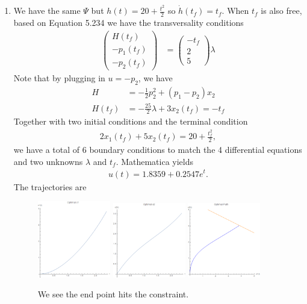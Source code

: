 \documentclass[12pt]{article}
\begin{document}
\begin{problem}[1]
\begin{enumerate}[label=(\alph*)]
\item We have the same $\Psi $ but $ h(t) = 20 +\frac{t^2}{ 2}$ so $ \dot{h}(t_f) = t_f$. When $ t_f$ is also free, based on Equation 5.234 we have the transversality conditions
\begin{align*}
	\begin{pmatrix} H(t_f)\\ -p_1(t_f)\\-p_2(t_f) \end{pmatrix} &= \begin{pmatrix} -t_f\\ 2\\5 \end{pmatrix} \lambda 
\end{align*}
Note that by plugging in $ u=-p_2$, we have
\begin{align*}
	H &= -\frac{1}{2} p_2^2+(p_1-p_2)x_2\\
	H(t_f)&= -\frac{25}{2} \lambda + 3x_2(t_f) = -t_f 
\end{align*}
Together with two initial conditions and the terminal condition
\begin{align*}
	2x_1(t_f) +5x_2(t_f) = 20 + \frac{t_f^2}{ 2},
\end{align*}
we have a total of 6 boundary conditions to match the 4 differential equations and two unknowns $ \lambda$ and $ t_f$. Mathematica yields
\begin{align*}
	u(t) = 1.8359 + 0.2547 e^{t} .
\end{align*}
The trajectories are
~\begin{figure}[H]
	\centering
	\includegraphics[width=0.3\textwidth]{./figures/4.15.png}
	\includegraphics[width=0.3\textwidth]{./figures/4.16.png}
	\includegraphics[width=0.3\textwidth]{./figures/4.17.png}
	\caption{We see the end point hits the constraint.}
\end{figure}
\end{enumerate}
\end{problem}
\end{document}
